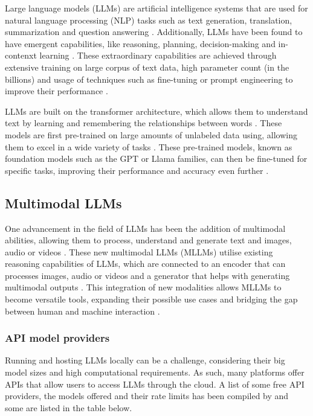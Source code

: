Large language models (LLMs) are artificial intelligence systems that are used for natural language processing (NLP) tasks such as text generation, translation, summarization and question answering \parencite{llm2,llm_healthcare}. Additionally, LLMs have been found to have emergent capabilities, like reasoning, planning, decision-making and in-contenxt learning \parencite{llm2}. These extraordinary capabilities are achieved through extensive training on large corpus of text data, high parameter count (in the billions) and usage of techniques such as fine-tuning or prompt engineering to improve their performance \parencite{llm2,llm_healthcare}.

LLMs are built on the transformer architecture, which allows them to understand text by learning and remembering the relationships between words \parencite{llm}. These models are first pre-trained on large amounts of unlabeled data using, allowing them to excel in a wide variety of tasks \parencite{foundation, llm2}. These pre-trained models, known as foundation models such as the GPT or Llama families, can then be fine-tuned for specific tasks, improving their performance and accuracy even further \parencite{gpt4,llama3,llm2}.

\subsection{Multimodal LLMs}

One advancement in the field of LLMs has been the addition of multimodal abilities, allowing them to process, understand and generate text and images, audio or videos \parencite{mllm, mllm2}. These new multimodal LLMs (MLLMs) utilise existing reasoning capabilities of LLMs, which are connected to an encoder that can processes images, audio or videos and a generator that helps with generating multimodal outputs \parencite{mllm}. This integration of new modalities allows MLLMs to become versatile tools, expanding their possible use cases and bridging the gap between human and machine interaction \parencite{llm_healthcare}.

\subsubsection{API model providers}

Running and hosting LLMs locally can be a challenge, considering their big model sizes and high computational requirements. As such, many platforms offer APIs that allow users to access LLMs through the cloud. A list of some free API providers, the models offered and their rate limits has been compiled by \textcite{llmapi} and some are listed in the table below.


